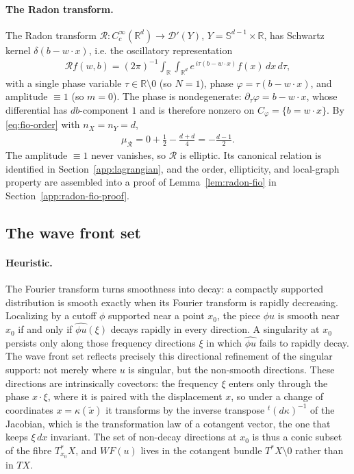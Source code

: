 \documentclass[12pt]{article}
\numberwithin{equation}{section}
\numberwithin{figure}{section}
\numberwithin{equation}{section}
\newcommand{\R}{\mathbb{R}}
\newcommand{\Sph}{\mathbb S}
\begin{document}
\paragraph{The Radon transform.}
The Radon transform $\mathcal R:C_c^\infty(\R^d)\to\mathcal D'(Y)$,
$Y=\Sph^{d-1}\times\R$, has Schwartz kernel $\delta(b-w\cdot x)$, i.e. the
oscillatory representation
\begin{align}
    \mathcal Rf(w,b)
    =(2\pi)^{-1}\int_{\R}\int_{\R^d}e^{\,i\tau(b-w\cdot x)}f(x)\,dx\,d\tau,
    \label{eq:radon-oscillatory}
\end{align}
with a single phase variable $\tau\in\R\setminus0$ (so $N=1$), phase
$\varphi=\tau(b-w\cdot x)$, and amplitude $\equiv1$ (so $m=0$).  The phase is
nondegenerate: $\partial_\tau\varphi=b-w\cdot x$, whose differential has
$db$-component $1$ and is therefore nonzero on $C_\varphi=\{b=w\cdot x\}$.  By
\eqref{eq:fio-order} with $n_X=n_Y=d$,
\begin{align*}
    \mu_{\mathcal R}=0+\tfrac12-\tfrac{d+d}{4}=-\tfrac{d-1}{2}.
\end{align*}
The amplitude $\equiv1$ never vanishes, so $\mathcal R$ is elliptic.  Its canonical
relation is identified in Section~\ref{app:lagrangian}, and the order, ellipticity, and
local-graph property are assembled into a proof of Lemma~\ref{lem:radon-fio} in
Section~\ref{app:radon-fio-proof}.

\subsection{The wave front set}
\label{app:wf}

\paragraph{Heuristic.}
The Fourier transform turns smoothness into decay: a compactly supported
distribution is smooth exactly when its Fourier transform is rapidly decreasing.
Localizing by a cutoff $\phi$ supported near a point $x_0$, the piece $\phi u$ is
smooth near $x_0$ if and only if $\widehat{\phi u}(\xi)$ decays rapidly in
every direction.  A singularity at $x_0$ persists only along those frequency
directions $\xi$ in which $\widehat{\phi u}$ fails to rapidly decay.  The wave front
set reflects precisely this directional refinement of the singular support: not
merely where $u$ is singular, but the non-smooth directions. 
These directions are intrinsically covectors: the
frequency $\xi$ enters only through the phase $x\cdot\xi$, where it is paired with
the displacement $x$, so under a change of coordinates $x=\kappa(\tilde x)$ it
transforms by the inverse transpose ${}^{t}(d\kappa)^{-1}$ of the Jacobian, which is the
transformation law of a cotangent vector, the one that keeps $\xi\,dx$ invariant.
The set of non-decay directions at $x_0$ is thus a conic subset of the fibre
$T^*_{x_0}X$, and $WF(u)$ lives in the cotangent bundle $T^*X\setminus0$ rather than
in $TX$.
\end{document}
